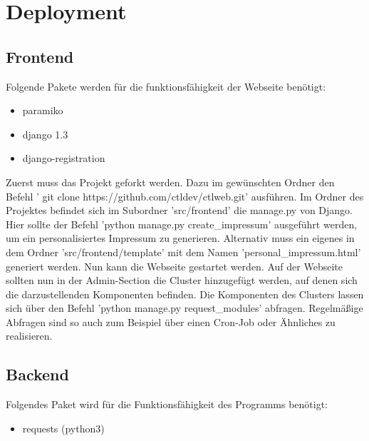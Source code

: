 
\chapter{Deployment}
\section{Frontend}
Folgende Pakete werden für die funktionsfähigkeit der Webseite benötigt:
  \begin{itemize}
	\item paramiko
	\item django 1.3
	\item django-registration
  \end{itemize}


Zuerst muss das Projekt geforkt werden. Dazu im gewünschten Ordner den Befehl '
git clone https://github.com/ctldev/ctlweb.git' ausführen. Im Ordner des
Projektes befindet sich im Subordner 'src/frontend' die manage.py von Django.
Hier sollte der Befehl 'python manage.py create\_impressum' ausgeführt werden,
um ein personalisiertes Impressum zu generieren. Alternativ muss ein eigenes 
in dem Ordner 'src/frontend/template' mit dem Namen
'personal\_impressum.html' generiert werden. Nun kann die Webseite gestartet
werden.
Auf der Webseite sollten nun in der Admin-Section die Cluster hinzugefügt werden,
auf denen sich die darzustellenden Komponenten befinden. Die Komponenten des
Clusters lassen sich über den Befehl 'python manage.py request\_modules'
abfragen. Regelmäßige Abfragen sind so auch zum Beispiel über einen Cron-Job
oder Ähnliches zu realisieren.
\section{Backend}
Folgendes Paket wird für die Funktionsfähigkeit des Programms benötigt:
\begin{itemize}
  \item requests (python3)
\end{itemize}
